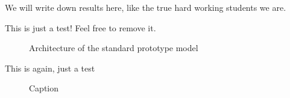 We will write down results here, like the true hard working students we are.

This is just a test! Feel free to remove it.

\begin{figure}[h]
    \centering
    
    \caption{Architecture of the standard prototype model}
    
    \label{fig:my_label}
\end{figure}

This is again, just a test

\begin{figure}
    \centering
    
    \caption{Caption}
\end{figure}